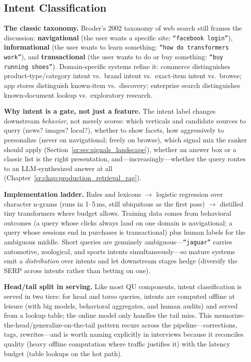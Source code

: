 \subsection{Intent Classification}
\label{sr:sec:query_intent}

\textbf{The classic taxonomy.} Broder's 2002 taxonomy of web search still frames the discussion: \textbf{navigational} (the user wants a specific site: \texttt{``facebook login''}), \textbf{informational} (the user wants to learn something: \texttt{``how do transformers work''}), and \textbf{transactional} (the user wants to do or buy something: \texttt{``buy running shoes''}). Domain-specific systems refine it: commerce distinguishes product-type/category intent vs.\ brand intent vs.\ exact-item intent vs.\ browse; app stores distinguish known-item vs.\ discovery; enterprise search distinguishes known-document lookup vs.\ exploratory research.

\textbf{Why intent is a gate, not just a feature.} The intent label changes downstream \textit{behavior}, not merely scores: which verticals and candidate sources to query (news? images? local?), whether to show facets, how aggressively to personalize (never on navigational; freely on browse), which signal mix the ranker should apply (Section~\ref{sr:sec:signals_landscape}), whether an answer box or a classic list is the right presentation, and---increasingly---whether the query routes to an LLM-synthesized answer at all (Chapter~\ref{sr:chap:production_retrieval_rag}).

\textbf{Implementation ladder.} Rules and lexicons $\to$ logistic regression over character n-grams (runs in 1--5\,ms, still ubiquitous as the first pass) $\to$ distilled tiny transformers where budget allows. Training data comes from behavioral outcomes (a query whose clicks always land on one domain is navigational; a query whose sessions end in purchases is transactional) plus human labels for the ambiguous middle. Short queries are genuinely ambiguous---\texttt{``jaguar''} carries automotive, zoological, and sports intents simultaneously---so mature systems emit a \textit{distribution} over intents and let downstream stages hedge (diversify the SERP across intents rather than betting on one).

\textbf{Head/tail split in serving.} Like most QU components, intent classification is served in two tiers: for head and torso queries, intents are computed offline at leisure (with big models, behavioral aggregates, and human audits) and served from a lookup table; the online model only handles the tail miss. This memorize-the-head/generalize-on-the-tail pattern recurs across the pipeline---corrections, tags, rewrites---and is worth naming explicitly in interviews because it reconciles quality (heavy offline computation where traffic justifies it) with the latency budget (table lookups on the hot path).

